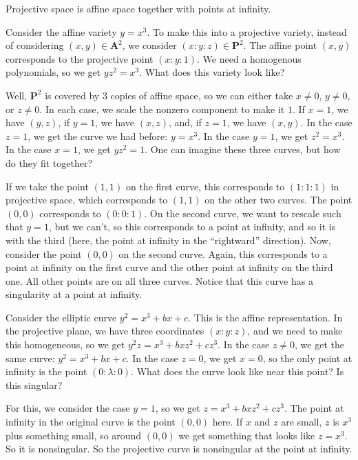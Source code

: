 \documentclass [11 pt, oneside, margin = 1 in] {article}
\begin{document}
Projective space is affine space together with points at infinity.
\begin{example}[ ]\label{}\text{}
Consider the affine variety $y=x^3$. To make this into a projective variety, instead of considering $(x,y) \in \mathbf{A}^2$, we consider $(x:y:z)\in \mathbf{P}^2$. The affine point $(x,y)$ corresponds to the projective point $(x:y:1)$. We need a homogenous polynomials, so we get $yz^2 = x^3$. What does this variety look like?

Well, $\mathbf{P}^2$ is covered by $3$ copies of affine space, so we can either take $x\ne 0$, $y\ne 0$, or $z\ne 0$. In each case, we scale the nonzero component to make it $1$. If $x=1$, we have $(y,z)$, if $y=1$, we have $(x,z)$, and, if $z=1$, we have $(x,y)$. In the case $z=1$, we get the curve we had before: $y=x^3$. In the case $y=1$, we get $z^2 = x^3$. In the case $x=1$, we get $yz^2 = 1$. One can imagine these three curves, but how do they fit together? 

If we take the point $(1,1)$ on the first curve, this corresponds to $(1:1:1)$ in projective space, which corresponds to $(1,1)$ on the other two curves. The point $(0,0)$ corresponds to $(0:0:1)$. On the second curve, we want to rescale such that $y=1$, but we can't, so this corresponds to a point at infinity, and so it is with the third (here, the point at infinity in the ``rightward'' direction). Now, consider the point $(0,0)$ on the second curve. Again, this corresponds to a point at infinity on the first curve and the other point at infinity on the third one. All other points are on all three curves. Notice that this curve has a singularity at a point at infinity.
\end{example}

\begin{example}[ ]\label{}\text{}
Consider the elliptic curve $y^2 = x^3+bx+c$. This is the affine representation. In the projective plane, we have three coordinates $(x:y:z)$, and we need to make this homogeneous, so we get $y^2z = x^3 + bxz^2 + cz^3$. In the case $z\ne 0$, we get the same curve: $y^2 = x^3 + bx + c$. In the case $z=0$, we get $x=0$, so the only point at infinity is the point $(0:\lambda:0)$. What does the curve look like near this point? Is this singular?

For this, we consider the case $y=1$, so we get $z = x^3 + bxz^2 + cz^3$. The point at infinity in the original curve is the point $(0,0)$ here. If $x$ and $z$ are small, $z$ is $x^3$ plus something small, so around $(0,0)$ we get something that looks like $z=x^3$. So it is nonsingular. So the projective curve is nonsingular at the point at infinity.
\end{example}
\end{document}

